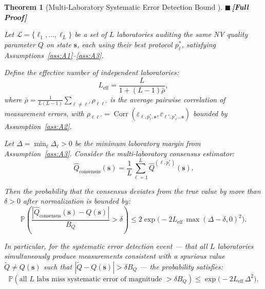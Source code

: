 \documentclass[11pt,a4paper]{article}
\newcommand{\eff}{\mathrm{eff}}
\newtheorem{theorem}{Theorem}[section]
\theoremstyle{definition}
\newcommand{\rigorFull}{{\color{rigorcolor}$\blacksquare$\,\textbf{[Full Proof]}}}
\DeclareMathOperator{\Corr}{Corr}
\newcommand{\Pbb}{\mathbb{P}}
\newcommand{\cL}{\mathcal{L}}
\newcommand{\NV}{NV}
\begin{document}
\begin{theorem}[Multi-Laboratory Systematic Error Detection Bound ]
\label{thm:error_detection}
\rigorFull

Let $\cL = \{\ell_1, \dots, \ell_L\}$ be a set of $L$ laboratories
auditing the same \NV{} quality parameter $Q$ on state $\mathbf{s}$,
each using their best protocol $p^*_\ell$, satisfying
Assumptions~\ref{ass:A1}--\ref{ass:A3}.

Define the effective number of independent laboratories:
\begin{equation}
    L_{\eff} = \frac{L}{1 + (L-1)\bar{\rho}},
    \label{eq:L_eff}
\end{equation}
where $\bar{\rho} = \frac{1}{L(L-1)} \sum_{\ell \neq \ell'} \rho_{\ell\ell'}$
is the average pairwise correlation of measurement errors, with
$\rho_{\ell\ell'} = \Corr(\varepsilon_{\ell, p^*_\ell, \mathbf{s}},
\varepsilon_{\ell', p^*_{\ell'}, \mathbf{s}})$ bounded by
Assumption~\ref{ass:A2}.

Let $\Delta = \min_\ell \Delta_\ell > 0$ be the minimum laboratory
margin from Assumption~\ref{ass:A3}. Consider the multi-laboratory
consensus estimator:
\begin{equation}
    \widehat{Q}_{\text{consensus}}(\mathbf{s}) = \frac{1}{L} \sum_{\ell=1}^{L} \widehat{Q}^{(\ell, p^*_\ell)}(\mathbf{s}).
    \label{eq:consensus}
\end{equation}

Then the probability that the consensus deviates from the true value
by more than $\delta > 0$ after normalization is bounded by:
\begin{equation}
    \Pbb\left(\frac{|\widehat{Q}_{\text{consensus}}(\mathbf{s}) - Q(\mathbf{s})|}{B_Q} > \delta \right)
    \leq 2 \exp\!\bigl(-2 L_{\eff} \, \max(\Delta - \delta, 0)^2 \bigr).
    \label{eq:hoeffding_bound}
\end{equation}

In particular, for the systematic error detection event — that all
$L$ laboratories simultaneously produce measurements consistent with
a spurious value $\widetilde{Q} \neq Q(\mathbf{s})$ such that
$|\widetilde{Q} - Q(\mathbf{s})| > \delta B_Q$ — the probability satisfies:
\begin{equation}
    \Pbb(\text{all } L \text{ labs miss systematic error of magnitude } > \delta B_Q)
    \leq \exp\!\bigl(-2 L_{\eff} \, \Delta^2 \bigr).
    \label{eq:systematic_bound}
\end{equation}
\end{theorem}
\end{document}
